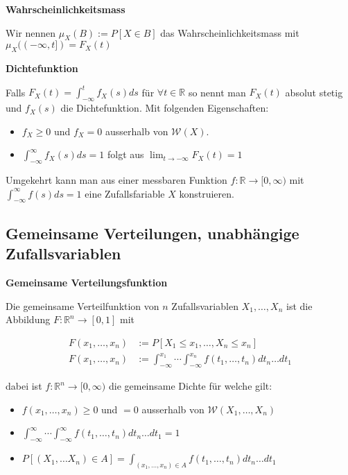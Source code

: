 \documentclass[25pt]{sciposter}
\newcommand{\R}{\mathbb{R}}
\newcommand{\W}{\mathcal{W}}
\newenvironment{method}[1]{\begin{mdframed}[backgroundcolor=blue!10,innertopmargin=15pt, innerbottommargin=15pt,nobreak=true]
		\textbf{#1 }
	}
	{ 
	\end{mdframed}
}
\begin{document}
\begin{multicols}{3}
\begin{method}{Wahrscheinlichkeitsmass}
	Wir nennen $\mu_X(B) := P[X \in B]$ das Wahrscheinlichkeitsmass mit $\mu_X((-\infty,t]) = F_X(t)$
\end{method}

\begin{method}{Dichtefunktion}
	Falls $F_X(t) = \int_{-\infty}^t f_X(s) ds$ für $\forall t\in\R$ so nennt man $F_X(t)$ absolut stetig und $f_X(s)$ die Dichtefunktion. Mit folgenden Eigenschaften:
	\begin{itemize}
		\item $f_X \geq 0$ und $f_X = 0$ ausserhalb von $\W(X)$.
		\item $\int_{-\infty}^\infty f_X(s) ds = 1$ folgt aus $\lim_{t \to -\infty}F_X(t) = 1$
	\end{itemize}

Umgekehrt kann man aus einer messbaren Funktion $f:\R\to[0,\infty)$ mit $\int_{-\infty}^\infty f(s)ds = 1$ eine Zufallsfariable $X$ konstruieren.
\end{method}



\subsection*{Gemeinsame Verteilungen, unabhängige Zufallsvariablen}


\begin{method}{Gemeinsame Verteilungsfunktion}
	Die gemeinsame Verteilfunktion von $n$ Zufallsvariablen $X_1,\ldots, X_n$ ist die Abbildung $F:\R^n \to [0,1]$ mit
	
	\begin{align*}
	F(x_1,\ldots,x_n) &:= P[X_1 \leq x_1, \ldots , X_n \leq x_n]\\
	F(x_1,\ldots,x_n) &:= \int_{-\infty}^{x_1}\cdots \int_{-\infty}^{x_n}f(t_1,\ldots,t_n)dt_n\ldots dt_1
	\end{align*}
	
	dabei ist $f:\R^n \to [0,\infty)$ die gemeinsame Dichte für welche gilt:
	\begin{itemize}
		\item $f(x_1,\ldots,x_n)\geq 0$ und $=0$ ausserhalb von $\W(X_1,\ldots,X_n)$
		\item $\int_{-\infty}^{\infty}\cdots \int_{-\infty}^{\infty}f(t_1,\ldots,t_n)dt_n\ldots dt_1 = 1$
		\item $P[(X_1,\ldots X_n)\in A] = \int_{(x_1,\ldots,x_n)\in A}f(t_1,\ldots,t_n)dt_n\ldots dt_1$
	\end{itemize} 
\end{method}


\end{multicols}
\end{document}
